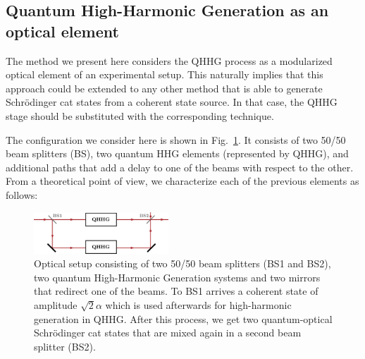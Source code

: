 \subsection{Quantum High-Harmonic Generation as an optical element}
The method we present here considers the QHHG process as a modularized optical element of an experimental setup. This naturally implies that this approach could be extended to any other method that is able to generate Schrödinger cat states from a coherent state source. In that case, the QHHG stage should be substituted with the corresponding technique.

The configuration we consider here is shown in Fig.~\ref{Fig2}. It consists of two 50/50 beam splitters (BS), two quantum HHG elements (represented by QHHG), and additional paths that add a delay to one of the beams with respect to the other. From a theoretical point of view, we characterize each of the previous elements as follows:
\begin{figure}
    \centering
    \includegraphics[width = 0.45\textwidth]{Fig2.pdf}
    \caption{Optical setup consisting of two 50/50 beam splitters (BS1 and BS2), two quantum High-Harmonic Generation systems and two mirrors that redirect one of the beams. To BS1 arrives a coherent state of amplitude $\sqrt{2}\alpha$ which is used afterwards for high-harmonic generation in QHHG. After this process, we get two quantum-optical Schrödinger cat states that are mixed again in a second beam splitter (BS2).}
    \label{Fig2}
\end{figure}

